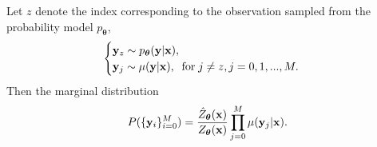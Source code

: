 \begin{lemma}
\label{lemma: appendix probability simplification}
Let $z$ denote the index corresponding to the observation sampled from the probability model $p_{\boldsymbol\theta}$,
\begin{equation*}
\begin{cases} 
    \mathbf{y}_z \sim p_{\boldsymbol\theta}(\mathbf{y} | \mathbf{x}), \\
    \mathbf{y}_j \sim \mu(\mathbf{y} | \mathbf{x}),
    \;\; {\rm for} \; j \neq z, j = 0,1,...,M.
\end{cases}
\end{equation*}
Then the marginal distribution
\begin{equation*}
P(\{\mathbf{y}_i\}_{i=0}^M)
=
\frac{\hat{Z}_{\boldsymbol\theta}(\mathbf{x})} {Z_{\boldsymbol\theta}(\mathbf{x})}
\prod_{j=0}^M \mu(\mathbf{y}_j | \mathbf{x}).
\end{equation*}
\end{lemma}

